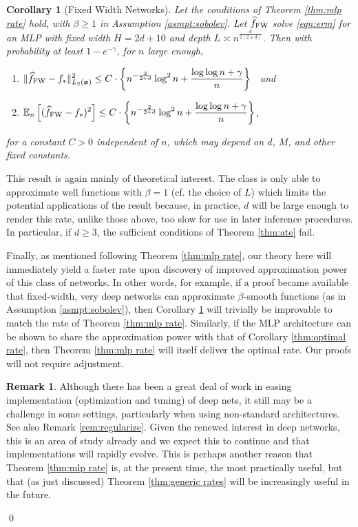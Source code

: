 \documentclass[11pt]{article}
\newtheorem{corollary}{Corollary}
\numberwithin{equation}{section}
\theoremstyle{definition}
\newtheorem{remarkTmp}{Remark}
\newenvironment{remark}
	{\medskip  \begin{remarkTmp} 	}
	{ 
		\renewcommand{\qedsymbol}{$\lrcorner$}
		\qed 
		\end{remarkTmp} 
	}
\newcommand{\E}{\mathbb{E}}
\newcommand{\bx}{\bm{x}}
\begin{document}
\begin{corollary}[Fixed Width Networks]	
	\label{thm:fixed width}
	Let the conditions of Theorem \ref{thm:mlp rate} hold, with $\beta \geq 1$ in Assumption \ref{asmpt:sobolev}. Let $\widehat{f}_{\rm FW}$ solve \eqref{eqn:erm} for an MLP with fixed width $H = 2d+10$ and depth $L \asymp n^{\frac{d}{2(2+d)}}$. Then with probability at least $1 - e^{-\gamma}$, for $n$ large enough,
	\begin{enumerate}
		\item $\displaystyle  \| \widehat{f}_{\rm FW} - f_* \|_{L_2(\bx)}^2  \leq  C \cdot \left\{ n^{-\frac{2}{2+d}} \log^2 n + \frac{\log \log n + \gamma}{n} \right\}$ \ and 
		\item $\displaystyle \E_n \left[ ( \widehat{f}_{\rm FW} - f_* )^2 \right] \leq C \cdot \left\{ n^{-\frac{2}{2+d}} \log^2 n + \frac{\log \log n + \gamma}{n} \right\} $,
	\end{enumerate}
	for a constant $C>0$ independent of $n$, which may depend on $d$, $M$, and other fixed constants.
\end{corollary}

This result is again mainly of theoretical interest. The class is only able to approximate well functions with $\beta = 1$ (cf. the choice of $L$) which limits the potential applications of the result because, in practice, $d$ will be large enough to render this rate, unlike those above, too slow for use in later inference procedures. In particular, if $d \geq 3$, the sufficient conditions of Theorem \ref{thm:ate} fail.

Finally, as mentioned following Theorem \ref{thm:mlp rate}, our theory here will immediately yield a faster rate upon discovery of improved approximation power of this class of networks. In other words, for example, if a proof became available that fixed-width, very deep networks can approximate $\beta$-smooth functions (as in Assumption \ref{asmpt:sobolev}), then Corollary \ref{thm:fixed width} will trivially be improvable to match the rate of Theorem \ref{thm:mlp rate}. Similarly, if the MLP architecture can be shown to share the approximation power with that of Corollary \ref{thm:optimal rate}, then Theorem \ref{thm:mlp rate} will itself deliver the optimal rate. Our proofs will not require adjustment. 


\begin{remark}
	\label{rem:computation}
	Although there has been a great deal of work in easing implementation (optimization and tuning) of deep nets, it still may be a challenge in some settings, particularly when using non-standard architectures. See also Remark \ref{rem:regularize}. Given the renewed interest in deep networks, this is an area of study already \citep{hartford2017deep,polson2018posterior} and we expect this to continue and that implementations will rapidly evolve. This is perhaps another reason that Theorem \ref{thm:mlp rate} is, at the present time, the most practically useful, but that (as just discussed) Theorem \ref{thm:generic rates} will be increasingly useful in the future.
\end{remark}
\end{document}
